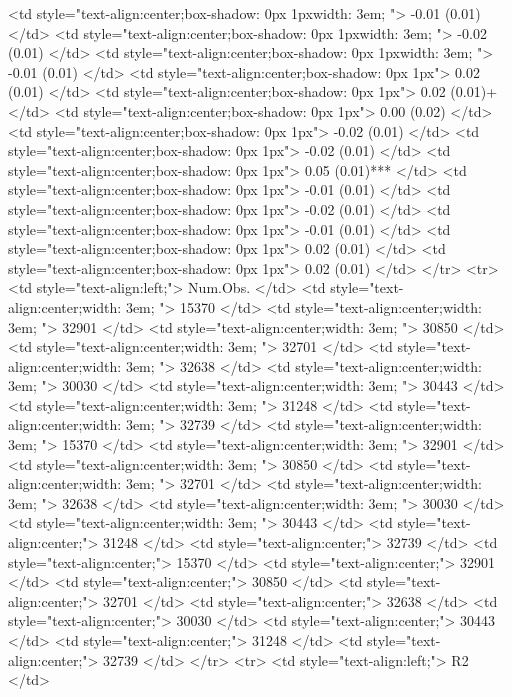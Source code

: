    <td style="text-align:center;box-shadow: 0px 1pxwidth: 3em; "> -0.01 (0.01) </td>
   <td style="text-align:center;box-shadow: 0px 1pxwidth: 3em; "> -0.02 (0.01) </td>
   <td style="text-align:center;box-shadow: 0px 1pxwidth: 3em; "> -0.01 (0.01) </td>
   <td style="text-align:center;box-shadow: 0px 1px"> 0.02 (0.01) </td>
   <td style="text-align:center;box-shadow: 0px 1px"> 0.02 (0.01)+ </td>
   <td style="text-align:center;box-shadow: 0px 1px"> 0.00 (0.02) </td>
   <td style="text-align:center;box-shadow: 0px 1px"> -0.02 (0.01) </td>
   <td style="text-align:center;box-shadow: 0px 1px"> -0.02 (0.01) </td>
   <td style="text-align:center;box-shadow: 0px 1px"> 0.05 (0.01)*** </td>
   <td style="text-align:center;box-shadow: 0px 1px"> -0.01 (0.01) </td>
   <td style="text-align:center;box-shadow: 0px 1px"> -0.02 (0.01) </td>
   <td style="text-align:center;box-shadow: 0px 1px"> -0.01 (0.01) </td>
   <td style="text-align:center;box-shadow: 0px 1px"> 0.02 (0.01) </td>
   <td style="text-align:center;box-shadow: 0px 1px"> 0.02 (0.01) </td>
  </tr>
  <tr>
   <td style="text-align:left;"> Num.Obs. </td>
   <td style="text-align:center;width: 3em; "> 15370 </td>
   <td style="text-align:center;width: 3em; "> 32901 </td>
   <td style="text-align:center;width: 3em; "> 30850 </td>
   <td style="text-align:center;width: 3em; "> 32701 </td>
   <td style="text-align:center;width: 3em; "> 32638 </td>
   <td style="text-align:center;width: 3em; "> 30030 </td>
   <td style="text-align:center;width: 3em; "> 30443 </td>
   <td style="text-align:center;width: 3em; "> 31248 </td>
   <td style="text-align:center;width: 3em; "> 32739 </td>
   <td style="text-align:center;width: 3em; "> 15370 </td>
   <td style="text-align:center;width: 3em; "> 32901 </td>
   <td style="text-align:center;width: 3em; "> 30850 </td>
   <td style="text-align:center;width: 3em; "> 32701 </td>
   <td style="text-align:center;width: 3em; "> 32638 </td>
   <td style="text-align:center;width: 3em; "> 30030 </td>
   <td style="text-align:center;width: 3em; "> 30443 </td>
   <td style="text-align:center;"> 31248 </td>
   <td style="text-align:center;"> 32739 </td>
   <td style="text-align:center;"> 15370 </td>
   <td style="text-align:center;"> 32901 </td>
   <td style="text-align:center;"> 30850 </td>
   <td style="text-align:center;"> 32701 </td>
   <td style="text-align:center;"> 32638 </td>
   <td style="text-align:center;"> 30030 </td>
   <td style="text-align:center;"> 30443 </td>
   <td style="text-align:center;"> 31248 </td>
   <td style="text-align:center;"> 32739 </td>
  </tr>
  <tr>
   <td style="text-align:left;"> R2 </td>

